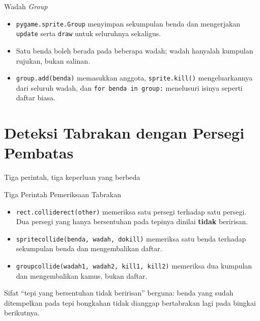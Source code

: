 \documentclass[aspectratio=169,10pt]{beamer}
\begin{document}
\begin{frame}{Wadah \emph{Group}}
\begin{center}
\end{center}
\vspace{-0.06cm}
\begin{itemize}
  \item \texttt{pygame.sprite.Group} menyimpan sekumpulan benda dan
        mengerjakan \texttt{update} serta \texttt{draw} untuk seluruhnya
        sekaligus.
  \item Satu benda boleh berada pada beberapa wadah; wadah hanyalah kumpulan
        rujukan, bukan salinan.
  \item \texttt{group.add(benda)} memasukkan anggota, \texttt{sprite.kill()}
        mengeluarkannya dari seluruh wadah, dan \texttt{for benda in group:}
        menelusuri isinya seperti daftar biasa.
\end{itemize}
\end{frame}

\section{Deteksi Tabrakan dengan Persegi Pembatas}
  {Tiga perintah, tiga keperluan yang berbeda}

\begin{frame}{Tiga Perintah Pemeriksaan Tabrakan}
\begin{itemize}
  \item \texttt{rect.colliderect(other)} memeriksa satu persegi terhadap satu
        persegi. Dua persegi yang hanya bersentuhan pada tepinya dinilai
        \textbf{tidak} beririsan.
  \item \texttt{spritecollide(benda, wadah, dokill)} memeriksa satu benda
        terhadap sekumpulan benda dan mengembalikan daftar.
  \item \texttt{groupcollide(wadah1, wadah2, kill1, kill2)} memeriksa dua
        kumpulan dan mengembalikan kamus, bukan daftar.
\end{itemize}
\vspace{0.16cm}
\begin{kotak}
Sifat ``tepi yang bersentuhan tidak beririsan'' berguna: benda yang sudah
ditempelkan pada tepi bongkahan tidak dianggap bertabrakan lagi pada bingkai
berikutnya.
\end{kotak}
\end{frame}
\end{document}
